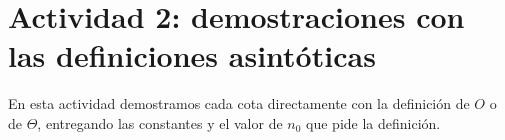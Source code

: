 \section{Actividad 2: demostraciones con las definiciones asintóticas}
\label{sec:act2}

En esta actividad demostramos cada cota directamente con la definición de $O$ o de
$\Theta$, entregando las constantes y el valor de $n_0$ que pide la definición.



